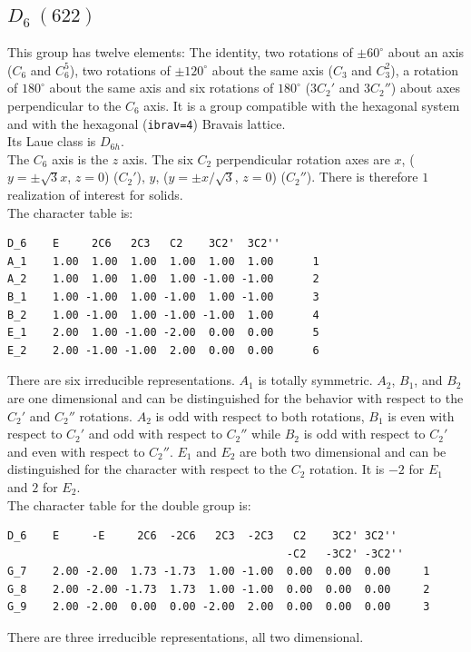 \documentclass[12pt,a4paper]{article}
\begin{document}
\subsection{\color{web-blue}$D_6\ (622)$} 
This group has twelve elements: The identity, two rotations of 
$\pm60^\circ$ about an axis ($C_6$ and $C_6^5$), two rotations of 
$\pm120^\circ$ about the same axis
($C_3$ and $C_3^2$), a rotation of $180^\circ$ about the same axis and
six rotations of $180^\circ$ ($3C_2'$ and $3C_2''$) about axes perpendicular 
to the $C_6$ axis. It is a group compatible with the hexagonal system and with the
hexagonal (\texttt{ibrav=4}) Bravais lattice. \\ 
Its Laue class is $D_{6h}$. \\
The $C_6$ axis is the $z$ axis. The six $C_2$ perpendicular rotation axes are
$x$, ($y=\pm\sqrt{3}x$, $z=0$) ($C_2'$), 
$y$, ($y=\pm x/\sqrt{3}$, $z=0$) ($C_2''$). There is therefore
$1$ realization of interest for solids. \\
The character table is:
\begin{verbatim}
D_6    E     2C6   2C3   C2    3C2'  3C2''
A_1    1.00  1.00  1.00  1.00  1.00  1.00      1
A_2    1.00  1.00  1.00  1.00 -1.00 -1.00      2
B_1    1.00 -1.00  1.00 -1.00  1.00 -1.00      3
B_2    1.00 -1.00  1.00 -1.00 -1.00  1.00      4
E_1    2.00  1.00 -1.00 -2.00  0.00  0.00      5
E_2    2.00 -1.00 -1.00  2.00  0.00  0.00      6
\end{verbatim}
There are six irreducible representations. $A_1$ is totally symmetric.
$A_2$, $B_1$, and $B_2$ are one dimensional and can be distinguished for the
behavior with respect to the $C_2'$ and $C_2''$ rotations. $A_2$ is odd 
with respect to both rotations, $B_1$ is even with respect to $C_2'$ and 
odd with respect to $C_2''$ while $B_2$ is odd with respect to $C_2'$ and
even with respect to $C_2''$. $E_1$ and $E_2$ are both two dimensional and
can be distinguished for the character with respect to the $C_2$ 
rotation. It is $-2$ for $E_1$ and $2$ for $E_2$. \\
The character table for the double group is:
\begin{verbatim}
D_6    E     -E     2C6  -2C6   2C3  -2C3   C2    3C2' 3C2''
                                           -C2   -3C2' -3C2''
G_7    2.00 -2.00  1.73 -1.73  1.00 -1.00  0.00  0.00  0.00     1
G_8    2.00 -2.00 -1.73  1.73  1.00 -1.00  0.00  0.00  0.00     2
G_9    2.00 -2.00  0.00  0.00 -2.00  2.00  0.00  0.00  0.00     3
\end{verbatim}
There are three irreducible representations, all two dimensional. 
\end{document}
